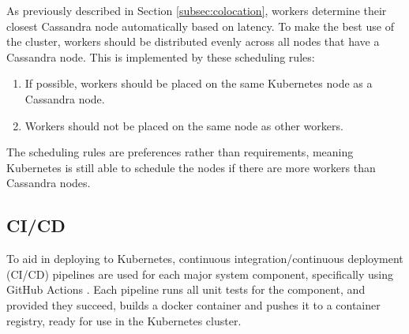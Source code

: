 As previously described in Section \ref{subsec:colocation}, workers determine their closest Cassandra node automatically based on latency. To make the best use of the cluster, workers should be distributed evenly across all nodes that have a Cassandra node. This is implemented by these scheduling rules:
\begin{enumerate}
	\item If possible, workers should be placed on the same Kubernetes node as a Cassandra node.
	\item Workers should not be placed on the same node as other workers.
\end{enumerate}

The scheduling rules are preferences rather than requirements, meaning Kubernetes is still able to schedule the nodes if there are more workers than Cassandra nodes.

\subsection{CI/CD}
To aid in deploying to Kubernetes, continuous integration/continuous deployment (CI/CD) pipelines are used for each major system component, specifically using GitHub Actions \cite{githubactions}. Each pipeline runs all unit tests for the component, and provided they succeed, builds a docker container and pushes it to a container registry, ready for use in the Kubernetes cluster.

